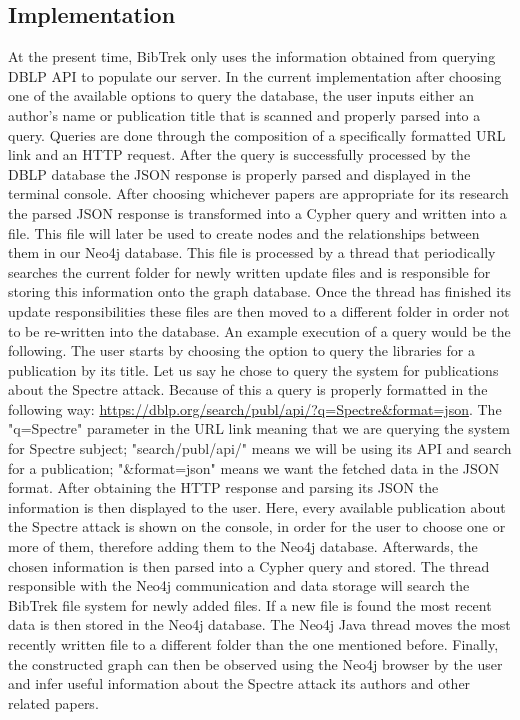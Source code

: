 \documentclass[twocolumn]{article}
\begin{document}
\subsection{Implementation}
At the present time, BibTrek only uses the information obtained from querying DBLP API to populate our server. In the current implementation after choosing one of the available options to query the database, the user inputs either an author's name or publication title that is scanned and properly parsed into a query. Queries are done through the composition of a specifically formatted URL link and an HTTP request. After the query is successfully processed by the DBLP database the JSON response is properly parsed and displayed in the terminal console. After choosing whichever papers are appropriate for its research the parsed JSON response is transformed into a Cypher query and written into a file. This file will later be used to create nodes and the relationships between them in our Neo4j database. This file is processed by a thread that periodically searches the current folder for newly written update files and is responsible for storing this information onto the graph database. Once the thread has finished its update responsibilities these files are then moved to a different folder in order not to be re-written into the database. An example execution of a query would be the following. The user starts by choosing the option to query the libraries for a publication by its title. Let us say he chose to query the system for publications about the Spectre attack. Because of this a query is properly formatted in the following way: \url{https://dblp.org/search/publ/api/?q=Spectre&format=json}. The "q=Spectre" parameter in the URL link meaning that we are querying the system for Spectre subject; "search/publ/api/" means we will be using its API and search for a publication; "&format=json" means we want the fetched data in the JSON format. After obtaining the HTTP response and parsing its JSON the information is then displayed to the user. Here, every available publication about the Spectre attack is shown on the console, in order for the user to choose one or more of them, therefore adding them to the Neo4j database. Afterwards, the chosen information is then parsed into a Cypher query and stored. The thread responsible with the Neo4j communication and data storage will search the BibTrek file system for newly added files. If a new file is found the most recent data is then stored in the Neo4j database. The Neo4j Java thread moves the most recently written file to a different folder than the one mentioned before. Finally, the constructed graph can then be observed using the Neo4j browser by the user and infer useful information about the Spectre attack its authors and other related papers.
\end{document}

